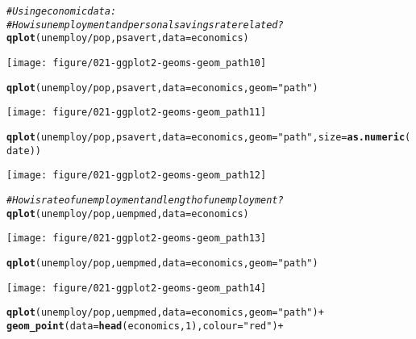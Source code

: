 \documentclass[a4paper,titlepage]{tufte-handout}\usepackage[]{graphicx}\usepackage[]{color}
\makeatletter
\def\maxwidth{ %
  \ifdim\Gin@nat@width>\linewidth
    \linewidth
  \else
    \Gin@nat@width
  \fi
}
\newcommand{\hlnum}[1]{\textcolor[rgb]{0.686,0.059,0.569}{#1}}%
\newcommand{\hlstr}[1]{\textcolor[rgb]{0.192,0.494,0.8}{#1}}%
\newcommand{\hlcom}[1]{\textcolor[rgb]{0.678,0.584,0.686}{\textit{#1}}}%
\newcommand{\hlopt}[1]{\textcolor[rgb]{0,0,0}{#1}}%
\newcommand{\hlstd}[1]{\textcolor[rgb]{0.345,0.345,0.345}{#1}}%
\newcommand{\hlkwc}[1]{\textcolor[rgb]{0.333,0.667,0.333}{#1}}%
\newcommand{\hlkwd}[1]{\textcolor[rgb]{0.737,0.353,0.396}{\textbf{#1}}}%
\newenvironment{kframe}{%
 \def\at@end@of@kframe{}%
 \ifinner\ifhmode%
  \def\at@end@of@kframe{\end{minipage}}%
  \begin{minipage}{\columnwidth}%
 \fi\fi%
 \def\FrameCommand##1{\hskip\@totalleftmargin \hskip-\fboxsep
 \colorbox{shadecolor}{##1}\hskip-\fboxsep
     \hskip-\linewidth \hskip-\@totalleftmargin \hskip\columnwidth}%
 \MakeFramed {\advance\hsize-\width
   \@totalleftmargin\z@ \linewidth\hsize
   \@setminipage}}%
 {\par\unskip\endMakeFramed%
 \at@end@of@kframe}
\newenvironment{knitrout}{}{} %
\makeatother
\begin{document}
\begin{knitrout}
\begin{kframe}\begin{alltt}
\hlcom{# Using economic data:}
\hlcom{# How is unemployment and personal savings rate related?}
\hlkwd{qplot}\hlstd{(unemploy}\hlopt{/}\hlstd{pop, psavert,} \hlkwc{data}\hlstd{=economics)}
\end{alltt}
\end{kframe}
\texttt{[image: figure/021-ggplot2-geoms-geom\_path10]} 
\begin{kframe}\begin{alltt}
\hlkwd{qplot}\hlstd{(unemploy}\hlopt{/}\hlstd{pop, psavert,} \hlkwc{data}\hlstd{=economics,} \hlkwc{geom}\hlstd{=}\hlstr{"path"}\hlstd{)}
\end{alltt}
\end{kframe}
\texttt{[image: figure/021-ggplot2-geoms-geom\_path11]} 
\begin{kframe}\begin{alltt}
\hlkwd{qplot}\hlstd{(unemploy}\hlopt{/}\hlstd{pop, psavert,} \hlkwc{data}\hlstd{=economics,} \hlkwc{geom}\hlstd{=}\hlstr{"path"}\hlstd{,} \hlkwc{size}\hlstd{=}\hlkwd{as.numeric}\hlstd{(date))}
\end{alltt}
\end{kframe}
\texttt{[image: figure/021-ggplot2-geoms-geom\_path12]} 
\begin{kframe}\begin{alltt}
\hlcom{# How is rate of unemployment and length of unemployment?}
\hlkwd{qplot}\hlstd{(unemploy}\hlopt{/}\hlstd{pop, uempmed,} \hlkwc{data}\hlstd{=economics)}
\end{alltt}
\end{kframe}
\texttt{[image: figure/021-ggplot2-geoms-geom\_path13]} 
\begin{kframe}\begin{alltt}
\hlkwd{qplot}\hlstd{(unemploy}\hlopt{/}\hlstd{pop, uempmed,} \hlkwc{data}\hlstd{=economics,} \hlkwc{geom}\hlstd{=}\hlstr{"path"}\hlstd{)}
\end{alltt}
\end{kframe}
\texttt{[image: figure/021-ggplot2-geoms-geom\_path14]} 
\begin{kframe}\begin{alltt}
\hlkwd{qplot}\hlstd{(unemploy}\hlopt{/}\hlstd{pop, uempmed,} \hlkwc{data}\hlstd{=economics,} \hlkwc{geom}\hlstd{=}\hlstr{"path"}\hlstd{)} \hlopt{+}
  \hlkwd{geom_point}\hlstd{(}\hlkwc{data}\hlstd{=}\hlkwd{head}\hlstd{(economics,} \hlnum{1}\hlstd{),} \hlkwc{colour}\hlstd{=}\hlstr{"red"}\hlstd{)} \hlopt{+}

\end{alltt}
\end{kframe}
\end{knitrout}
\end{document}
